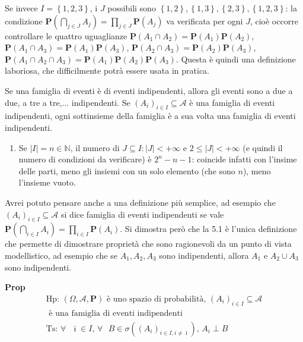 \documentclass{article}
\begin{document}
Se invece $I=\left\{ 1,2,3\right\} $, i $J$ possibili sono $\left\{
1,2\right\} ,\left\{ 1,3\right\} ,\left\{ 2,3\right\} ,\left\{ 1,2,3\right\} 
$: la condizione $\mathbf{P}\left( \bigcap_{j\in J}A_{j}\right) =\prod_{j\in
J}\mathbf{P}\left( A_{j}\right) $ va verificata per ogni $J$, cio\`{e}
occorre controllare le quattro uguaglianze $\mathbf{P}\left( A_{1}\cap
A_{2}\right) =\mathbf{P}\left( A_{1}\right) \mathbf{P}\left( A_{2}\right) $, 
$\mathbf{P}\left( A_{1}\cap A_{3}\right) =\mathbf{P}\left( A_{1}\right) 
\mathbf{P}\left( A_{3}\right) $, $\mathbf{P}\left( A_{2}\cap A_{3}\right) =%
\mathbf{P}\left( A_{2}\right) \mathbf{P}\left( A_{3}\right) $, $\mathbf{P}%
\left( A_{1}\cap A_{2}\cap A_{3}\right) =\mathbf{P}\left( A_{1}\right) 
\mathbf{P}\left( A_{2}\right) \mathbf{P}\left( A_{3}\right) $. Questa \`{e}
quindi una definizione laboriosa, che difficilmente potr\`{a} essere usata
in pratica.

Se una famiglia di eventi \`{e} di eventi indipendenti, allora gli eventi
sono a due a due, a tre a tre,... indipendenti. Se $\left( A_{i}\right)
_{i\in I}\subseteq \mathcal{A}$ \`{e} una famiglia di eventi indipendenti,
ogni sottinsieme della famiglia \`{e} a sua volta una famiglia di eventi
indipendenti.

\begin{enumerate}
\item Se $\left\vert I\right\vert =n\in 
\mathbb{N}
$, il numero di $J\subseteq I:\left\vert J\right\vert <+\infty $ e $2\leq
\left\vert J\right\vert <+\infty $ (e quindi il numero di condizioni da
verificare) \`{e} $2^{n}-n-1$: coincide infatti con l'insime delle parti,
meno gli insiemi con un solo elemento (che sono $n$), meno l'insieme vuoto.
\end{enumerate}

Avrei potuto pensare anche a una definizione pi\`{u} semplice, ad esempio
che $\left( A_{i}\right) _{i\in I}\subseteq \mathcal{A}$ si dice famiglia di
eventi indipendenti se vale $\mathbf{P}\left( \bigcap_{i\in I}A_{i}\right)
=\prod_{i\in I}\mathbf{P}\left( A_{i}\right) $. Si dimostra per\`{o} che la
5.1 \`{e} l'unica definizione che permette di dimostrare propriet\`{a} che
sono ragionevoli da un punto di vista modellistico, ad esempio che se $%
A_{1},A_{2},A_{3}$ sono indipendenti, allora $A_{1}$ e $A_{2}\cup A_{3}$
sono indipendenti.

\textbf{Prop}%
\begin{gather*}
\text{Hp}\text{: }\left( \Omega ,\mathcal{A},\mathbf{P}\right) \text{ \`{e}
uno spazio di probabilit\`{a}, }\left( A_{i}\right) _{i\in I}\subseteq 
\mathcal{A} \\
\text{ \`{e} una famiglia di eventi indipendenti} \\
\text{Ts}\text{: }\forall \text{ }\bar{\imath}\in I\text{, }\forall \text{ }%
B\in \sigma \left( \left( A_{i}\right) _{i\in I,i\neq \bar{\imath}}\right) 
\text{, }A_{i}\perp B\text{ }
\end{gather*}
\end{document}
